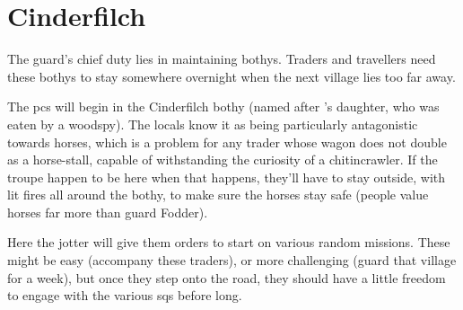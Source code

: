 \section{Cinderfilch }



\begin{multicols}{2}

\noindent
The \gls{guard}'s chief duty lies in maintaining \glspl{bothy}.
Traders and travellers need these \glspl{bothy} to stay somewhere overnight when the next \gls{village} lies too far away.

The \glspl{pc} will begin in the Cinderfilch \gls{bothy} (named after 's daughter, who was eaten by a woodspy).
The locals know it as being particularly antagonistic towards horses, which is a problem for any trader whose wagon does not double as a horse-stall, capable of withstanding the curiosity of a chitincrawler.
If the troupe happen to be here when that happens, they'll have to stay outside, with lit fires all around the \gls{bothy}, to make sure the horses stay safe (people value horses far more than \gls{guard} Fodder).

Here the \gls{jotter} will give them orders to start on various random missions.%
These might be easy (accompany these traders), or more challenging (guard that \gls{village} for a week), but once they step onto the road, they should have a little freedom to engage with the various \glspl{sq} before long.

\end{multicols}
